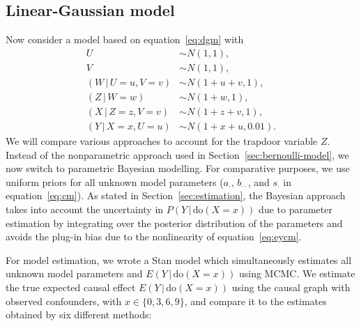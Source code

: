 \documentclass[11pt,a4paper,twoside]{article}
\newcommand{\+}[1]{\ensuremath{\mathbf{#1}}}
\newcommand{\doo}{\textrm{do}}
\newcommand{\given}{{ \, | \, }}
\begin{document}
	\subsection{Linear-Gaussian model}
	\label{sec:simulation_experiment}

	Now consider a model based on equation~\eqref{eq:dgm} with
	\begin{equation}
	\label{eq:lineargaussian}
	\begin{aligned}
	U &\sim N(1, 1),\\
	V &\sim N(1, 1),\\
	(W \given U = u, V = v) &\sim N(1 + u + v, 1),\\
	(Z \given W = w) &\sim N(1 + w, 1),\\
	(X \given Z = z, V = v) &\sim N(1 + z + v, 1),\\
	(Y \given X = x, U = u) &\sim N(1 + x + u, 0.01).
	\end{aligned}
	\end{equation}
	We will compare various approaches to account for the trapdoor variable $Z$. Instead of the nonparametric approach used in Section~\ref{sec:bernoulli-model}, we now switch to parametric Bayesian modelling. For comparative purposes, we use uniform priors for all unknown model parameters ($a_{\cdot}$, $b_{\cdot\cdot}$, and $s_{\cdot}$ in equation~\eqref{eq:cm}). As stated in Section~\ref{sec:estimation}, the Bayesian approach takes into account the uncertainty in $P(Y\given \doo(X = x))$ due to parameter estimation by integrating over the posterior distribution of the parameters and avoids the plug-in bias due to the nonlinearity of equation~\eqref{eq:eycm}. 
	
	For model estimation, we wrote a Stan model \citep{Stan, rstan} which simultaneously estimates all unknown model parameters and $E(Y \given \doo(X = x))$ using MCMC. We estimate the true expected causal effect $E(Y \given \doo(X = x))$ using the causal graph with observed confounders, with $x \in \{0, 3, 6, 9\}$, and compare it to the estimates obtained by six different methods:
	
\end{document}
